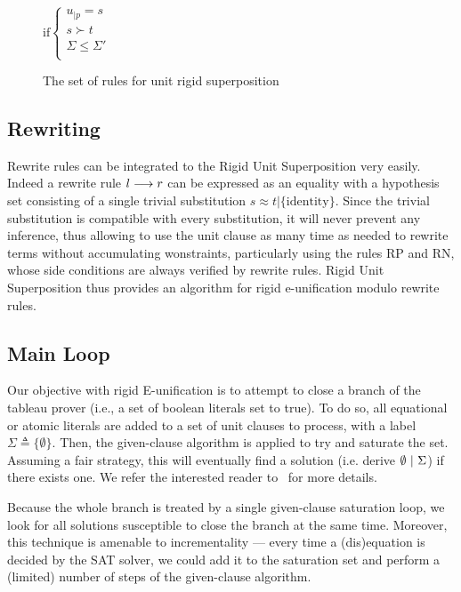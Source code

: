 \begin{figure}[htb]
\begin{center}
    \doubleLine{}
    \DP{}
    $\text{if} \left\{\begin{array}{l}
      u_{|p} = s \\
      s \succ t \\
      \Sigma \leq \Sigma'\\
    \end{array}\right.$

  \caption{The set of rules for unit rigid superposition}
  \label{fig:unit-sup-rules}
  \end{center}
\end{figure}

\subsection{Rewriting}

Rewrite rules can be integrated to the Rigid Unit Superposition very easily.
Indeed a rewrite rule $l \longrightarrow r$ can be expressed as an equality with a hypothesis
set consisting of a single trivial substitution $s \approx t | \{ \text{identity} \}$.
Since the trivial substitution is compatible with every substitution, it will never
prevent any inference, thus allowing to use the unit clause as many time as needed
to rewrite terms without accumulating wonstraints, particularly using the rules RP and RN,
whose side conditions are always verified by rewrite rules. Rigid Unit Superposition
thus provides an algorithm for rigid e-unification modulo rewrite rules.

\subsection{Main Loop}

Our objective with rigid E-unification is to attempt to close a branch
of the tableau prover (i.e., a set of boolean literals set to true).
To do so, all equational or atomic literals are added to a set of unit clauses
to process, with a label $\Sigma \triangleq \{ \emptyset \}$.
Then, the given-clause algorithm is applied to try and saturate the set.
Assuming a fair strategy, this will eventually find a solution
(i.e. derive $\emptyset  ~|~ \Sigma$) if there exists one.
We refer the interested reader to~\cite{SS02} for more details.

Because the whole branch is treated by a single given-clause saturation loop,
we look for all solutions susceptible to close the branch at the same time.
Moreover, this technique is amenable to incrementality --- every time a
(dis)equation is decided by the SAT solver, we could add it to the saturation
set and perform a (limited) number of steps of the given-clause algorithm.


